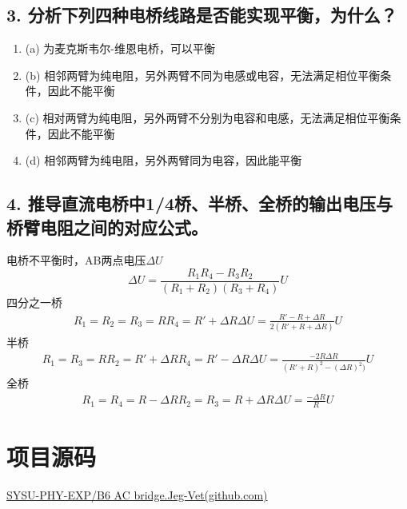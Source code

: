 \documentclass[12pt,a4paper,UTF8]{ctexart}
\begin{document}
\subsection*{3. 分析下列四种电桥线路是否能实现平衡，为什么？}
\begin{enumerate}[label=\arabic*.]
    \item (a) 为麦克斯韦尔-维恩电桥，可以平衡
    \item (b) 相邻两臂为纯电阻，另外两臂不同为电感或电容，无法满足相位平衡条件，因此不能平衡
    \item (c) 相对两臂为纯电阻，另外两臂不分别为电容和电感，无法满足相位平衡条件，因此不能平衡
    \item (d) 相邻两臂为纯电阻，另外两臂同为电容，因此能平衡
\end{enumerate}
\subsection*{4. 推导直流电桥中1/4桥、半桥、全桥的输出电压与桥臂电阻之间的对应公式。}
电桥不平衡时，AB两点电压$\Delta U$
\begin{equation}
    \Delta U = \frac{R_1R_4-R_3R_2}{(R_1+R_2)(R_3+R_4)}U
\end{equation}
四分之一桥
\begin{gather}
    R_1=R_2=R_3=R
    R_4 = R' + \Delta R
    \Delta U = \frac{R'- R + \Delta R}{2(R'+ R + \Delta R)}U
\end{gather}
半桥
\begin{gather}
    R_1=R_3=R
    R_2 = R' + \Delta R
    R_4 = R' - \Delta R
    \Delta U = \frac{-2R\Delta R}{(R'+ R)^2 - (\Delta R)^2)}U
\end{gather}
全桥
\begin{gather}
    R_1=R_4=R - \Delta R
    R_2=R_3=R + \Delta R
    \Delta U = \frac{-\Delta R}{R}U
\end{gather}

\section*{项目源码}
\href{https://github.com/Jeg-Vet/SYSU-PHY-EXP/tree/main/B6-AC_bridge}{SYSU-PHY-EXP/B6 AC bridge.Jeg-Vet(github.com)}
\end{document}
